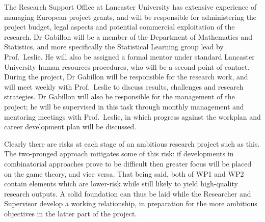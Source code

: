 \documentclass[a4paper,11pt]{article}
\begin{document}
The Research Support Office at Lancaster University has extensive experience of managing European project grants, and will be responsible for administering the project budget, legal aspects and potential commercial exploitation of the research.  Dr Gabillon will be a member of the Department of Mathematics and Statistics, and more specifically the Statistical Learning group lead by Prof.\ Leslie.  He will also be assigned a formal mentor under standard Lancaster University human resources procedures, who will be a second point of contact.  During the project, Dr Gabillon will be responsible for the research work, and will meet weekly with Prof.\ Leslie to discuss results, challenges and research strategies.  Dr Gabillon will also be responsible for the management of the project; he will be supervised in this task through monthly management and mentoring meetings with Prof.\ Leslie, in which progress against the workplan and career development plan will be discussed.

Clearly there are risks at each stage of an ambitious research project such as this. The two-pronged approach mitigates some of this risk: if developments in combinatorial approaches prove to be difficult then greater focus will be placed on the game theory, and vice versa.  That being said, both of WP1 and WP2 contain elements which are lower-risk while still likely to yield high-quality research outputs. A solid foundation can thus be laid while the Researcher and Supervisor develop a working relationship, in preparation for the more ambitious objectives in the latter part of the project.
\end{document}

